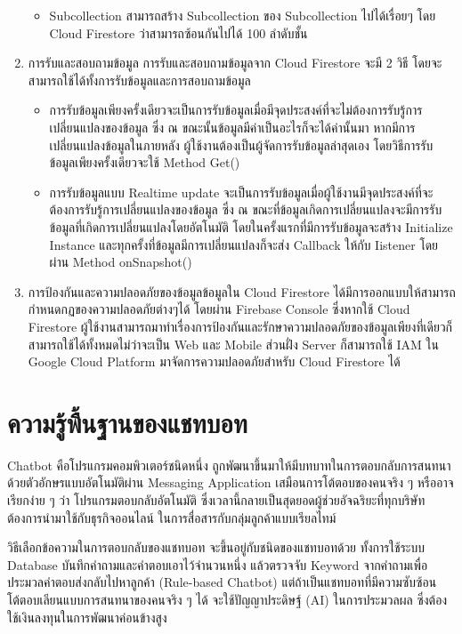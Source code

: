 \begin{enumerate}
\begin{itemize}
		\item Subcollection สามารถสร้าง Subcollection ของ Subcollection ไปได้เรื่อยๆ โดย Cloud Firestore ว่าสามารถซ้อนกันไปได้ 100 ลำดับชั้น
	\end{itemize}
	\item การรับและสอบถามข้อมูล
	การรับและสอบถามข้อมูลจาก Cloud Firestore จะมี 2 วิธี โดยจะสามารถใช้ได้ทั้งการรับข้อมูลและการสอบถามข้อมูล
	\begin{itemize}
		\item การรับข้อมูลเพียงครั้งเดียวจะเป็นการรับข้อมูลเมื่อมีจุดประสงค์ที่จะไม่ต้องการรับรู้การเปลี่ยนแปลงของข้อมูล ซึ่ง ณ ขณะนั้นข้อมูลมีค่าเป็นอะไรก็จะได้ค่านั้นมา หากมีการเปลี่ยนแปลงข้อมูลในภายหลัง ผู้ใช้งานต้องเป็นผู้จัดการรับข้อมูลล่าสุดเอง โดยวิธีการรับข้อมูลเพียงครั้งเดียวจะใช้ Method Get()
		\item การรับข้อมูลแบบ Realtime update จะเป็นการรับข้อมูลเมื่อผู้ใช้งานมีจุดประสงค์ที่จะต้องการรับรู้การเปลี่ยนแปลงของข้อมูล ซึ่ง ณ ขณะที่ข้อมูลเกิดการเปลี่ยนแปลงจะมีการรับข้อมูลที่เกิดการเปลี่ยนแปลงโดยอัตโนมัติ โดยในครั้งแรกที่มีการรับข้อมูลจะสร้าง Initialize Instance และทุกครั้งที่ข้อมูลมีการเปลี่ยนแปลงก็จะส่ง Callback ให้กับ Iistener โดยผ่าน Method onSnapshot()
	\end{itemize}
	\item การป้องกันและความปลอดภัยของข้อมูลข้อมูลใน Cloud Firestore ได้มีการออกแบบให้สามารถกำหนดกฏของความปลอดภัยต่างๆได้ โดยผ่าน Firebase Console  ซึ่งหากใช้ Cloud Firestore ผู้ใช้งานสามารถมาทำเรื่องการป้องกันและรักษาความปลอดภัยของข้อมูลเพียงที่เดียวก็สามารถใช้ได้ทั้งหมดไม่ว่าจะเป็น Web และ Mobile ส่วนฝั่ง Server ก็สามารถใช้ IAM ใน Google Cloud Platform มาจัดการความปลอดภัยสำหรับ Cloud Firestore ได้
\end{enumerate}


\section{ความรู้พื้นฐานของแชทบอท}
Chatbot คือโปรแกรมคอมพิวเตอร์ชนิดหนึ่ง ถูกพัฒนาขึ้นมาให้มีบทบาทในการตอบกลับการสนทนาด้วยตัวอักษรแบบอัตโนมัติผ่าน Messaging Application เสมือนการโต้ตอบของคนจริง ๆ หรืออาจเรียกง่าย ๆ ว่า โปรแกรมตอบกลับอัตโนมัติ ซึ่งเวลานี้กลายเป็นสุดยอดผู้ช่วยอัจฉริยะที่ทุกบริษัทต้องการนำมาใช้กับธุรกิจออนไลน์ ในการสื่อสารกับกลุ่มลูกค้าแบบเรียลไทม์

วิธีเลือกข้อความในการตอบกลับของแชทบอท จะขึ้นอยู่กับชนิดของแชทบอทด้วย ทั้งการใช้ระบบ Database บันทึกคำถามและคำตอบเอาไว้จำนวนหนึ่ง แล้วตรวจจับ Keyword จากคำถามเพื่อประมวลคำตอบส่งกลับไปหาลูกค้า (Rule-based Chatbot) แต่ถ้าเป็นแชทบอทที่มีความซับซ้อน โต้ตอบเลียนแบบการสนทนาของคนจริง ๆ ได้ จะใช้ปัญญาประดิษฐ์ (AI) ในการประมวลผล ซึ่งต้องใช้เงินลงทุนในการพัฒนาค่อนข้างสูง

